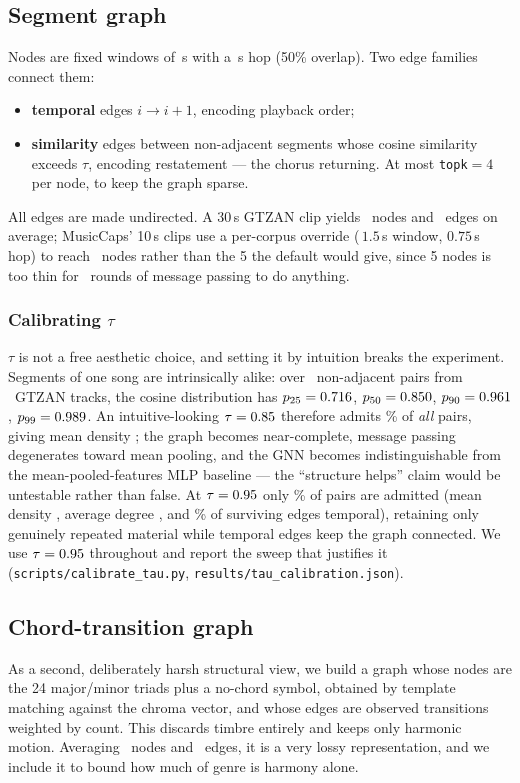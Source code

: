 \documentclass[10pt,a4paper]{article}
\begin{document}
\subsection{Segment graph}
Nodes are fixed windows of \cfgSegSec\,s with a \cfgHopSec\,s hop (50\% overlap).
Two edge families connect them:
\begin{itemize}\itemsep1pt
\item \textbf{temporal} edges $i \to i{+}1$, encoding playback order;
\item \textbf{similarity} edges between non-adjacent segments whose cosine
      similarity exceeds $\tau$, encoding restatement --- the chorus returning.
      At most \texttt{topk}$=4$ per node, to keep the graph sparse.
\end{itemize}
All edges are made undirected. A 30\,s GTZAN clip yields
\gtzanNodesMean\ nodes and \gtzanEdgesMean\ edges on average; MusicCaps' 10\,s
clips use a per-corpus override (\,$1.5$\,s window, $0.75$\,s hop) to reach
\mcNodesMean\ nodes rather than the 5 the default would give, since 5 nodes is
too thin for \cfgLayers\ rounds of message passing to do anything.

\subsubsection{Calibrating $\tau$}
\label{sec:tau}
$\tau$ is not a free aesthetic choice, and setting it by intuition breaks the
experiment. Segments of one song are intrinsically alike: over
\tcPairs\ non-adjacent pairs from \tcTracks\ GTZAN tracks, the cosine
distribution has $p_{25} = 0.716$, $p_{50} = 0.850$,
$p_{90} = 0.961$, $p_{99} = 0.989$.
An intuitive-looking $\tau = 0.85$ therefore admits \tcAdmitNaive\% of
\emph{all} pairs, giving mean density \tcDensityNaive; the graph becomes
near-complete, message passing degenerates toward mean pooling, and the GNN
becomes indistinguishable from the mean-pooled-features MLP baseline --- the
``structure helps'' claim would be untestable rather than false. At
$\tau = 0.95$ only \tcAdmitChosen\% of pairs are admitted (mean density
\tcDensityChosen, average degree \tcDegreeChosen, and
\tcFracTemporalChosen\% of surviving edges temporal), retaining only genuinely
repeated material while temporal edges keep the graph connected. We use
$\tau = 0.95$ throughout and report the sweep that justifies it
(\texttt{scripts/calibrate\_tau.py}, \texttt{results/tau\_calibration.json}).

\subsection{Chord-transition graph}
As a second, deliberately harsh structural view, we build a graph whose nodes are
the 24 major/minor triads plus a no-chord symbol, obtained by template matching
against the chroma vector, and whose edges are observed transitions weighted by
count. This discards timbre entirely and keeps only harmonic motion. Averaging
\chordNodesMean\ nodes and \chordEdgesMean\ edges, it is a very lossy
representation, and we include it to bound how much of genre is harmony alone.
\end{document}

